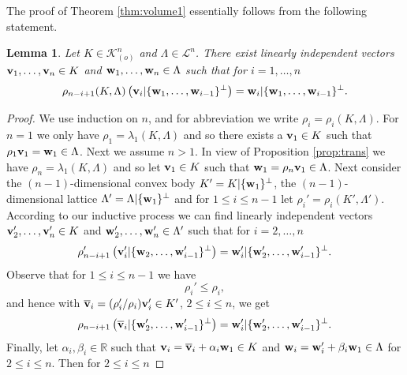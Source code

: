 \documentclass{amsart}
\newtheorem{lemma}[theorem]{Lemma}
\theoremstyle{definition}
\theoremstyle{remark}
\numberwithin{equation}{section}
\begin{document}
The proof of Theorem \ref{thm:volume1} essentially follows from the following statement.
\begin{lemma} Let $K\in {\mathcal K}^n_{(o)}$ and $\Lambda\in{\mathcal L}^n$. There exist linearly independent vectors ${\bf v}_1,\dots,{\bf v}_n\in K$ and ${\bf w}_1,\dots,{\bf w}_n\in\Lambda$ such that for $i=1,\dots,n$  
\begin{equation*}
     \rho_{n-i+1}(K,\Lambda)\left({\bf v}_{i}|
     \{{\bf w}_1,\dots,{\bf w}_{i-1}\}^\perp\right) = {\bf w}_i|\{{\bf w}_1,\dots,{\bf w}_{i-1}\}^\perp.
\end{equation*}
\label{lem:vectors}
\end{lemma} 

\begin{proof} We use induction on $n$, and for abbreviation we write $\rho_i=\rho_{i}(K,\Lambda)$. For $n=1$ we only have $\rho_1=\lambda_1(K,\Lambda)$ and so there exists a ${\bf v}_1\in K$ such that 
$\rho_1{\bf v}_1={\bf w}_1\in \Lambda$. Next we assume $n>1$. In view of Proposition \ref{prop:trans} we have $\rho_n=\lambda_1(K,\Lambda)$ and so let   ${\bf v}_1\in K$ such that 
${\bf w}_1=\rho_n{\bf v}_1\in \Lambda$. Next consider the $(n-1)$-dimensional convex body $K'=K|\{{\bf w}_1\}^\perp$, the $(n-1)$-dimensional lattice $\Lambda'=\Lambda|\{{\bf w}_1\}^\perp$ and for $1\leq i\leq n-1$ let $\rho_i'=\rho_i(K',\Lambda')$. According to our inductive process we can find linearly independent vectors ${\bf v}_2',\dots, {\bf v}_{n}'\in K$ and  ${\bf w}'_2,\dots,{\bf w}'_{n}\in\Lambda'$ such that for $i=2,\dots,n$
\begin{equation*}
     \rho_{n-i+1}'\left({\bf v}_{i}'|\{{\bf w}_2,\dots,{\bf w}_{i-1}'\}^\perp\right) ={\bf w}_i'|\{{\bf w}_2',\dots,{\bf w}_{i-1}'\}^\perp.
\end{equation*}
Observe that  for $1\leq i\leq n-1$ we have 
\begin{equation*}
     \rho_i'\leq \rho_i,
\end{equation*} 
and hence with $\overline{\bf v}_i= (\rho_i'/\rho_i){\bf v}_i'\in K'$, $2\leq i\leq n$,  we get  
\begin{equation*}
    \rho_{n-i+1} \left(\overline{\bf v}_i|\{{\bf w}_2',\dots,{\bf w}_{i-1}'\}^\perp\right)  ={\bf w}_i'|\{{\bf w}_2',\dots,{\bf w}_{i-1}'\}^\perp.
\end{equation*}
Finally, let $\alpha_i,\beta_i\in\mathbb{R}$ such that ${\bf v}_{i}=\overline{\bf v}_i+\alpha_i{\bf w}_1\in K$ and ${\bf w}_i={\bf w}_i'+\beta_i{\bf w}_1\in\Lambda$ for $2\leq i\leq n$. Then for $2\leq i\leq n$

\end{proof}
\end{document}
